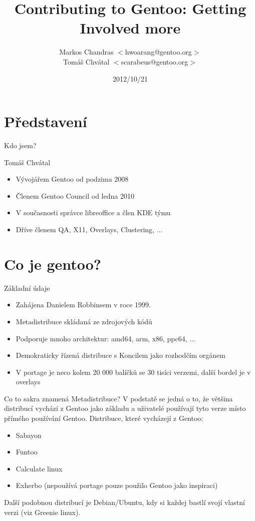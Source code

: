 \documentclass{beamer}
\title{Contributing to Gentoo: Getting Involved more}
\author[Markos Chandras \& Tomáš Chvátal]{Markos Chandras $<$hwoarang@gentoo.org$>$ \\ Tomáš Chvátal $<$scarabeus@gentoo.org$>$}
\date{2012/10/21}
\begin{document}
\frame{\titlepage}
\section{Představení}
\begin{frame}{Kdo jsem?}
	\begin{center}Tomáš Chvátal\end{center}
	\begin{itemize}
		\item Vývojářem Gentoo od podzima 2008
		\item Členem Gentoo Council od ledna 2010
		\item V současnosti správce libreoffice a člen KDE týmu
		\item Dříve členem QA, X11, Overlays, Clustering, ...
	\end{itemize}
\end{frame}
\section{Co je gentoo?}

\begin{frame}{Základní údaje}
	\begin{itemize}
		\item Zahájena Danielem Robbinsem v roce 1999.
		\item Metadistribuce skládaná ze zdrojových kódů
		\item Podporuje mnoho architektur: amd64, arm, x86, ppc64, ...
		\item Demokraticky řízená distribuce s Koncilem jako rozhodčím orgánem
		\item V portage je neco kolem 20 000 balíčků se 30 tisíci verzemi, další bordel je v overlays
	\end{itemize}
\end{frame}

\begin{frame}{Co to sakra znamená Metadistribuce?}
	V podstatě se jedná o to, že většina distribucí vychází z Gentoo jako základu a uživatelé používají tyto verze místo přímého používání Gentoo.
	Distribuce, které vycházejí z Gentoo:
	\begin{itemize}
		\item Sabayon
		\item Funtoo
		\item Calculate linux
		\item Exherbo (nepoužívá portage pouze použilo Gentoo jako inspiraci)
	\end{itemize}
	Další podobnou distribucí je Debian/Ubuntu, kdy si každej  bastlí svojí vlastní verzi (viz Greenie linux).
\end{frame}
\end{document}

